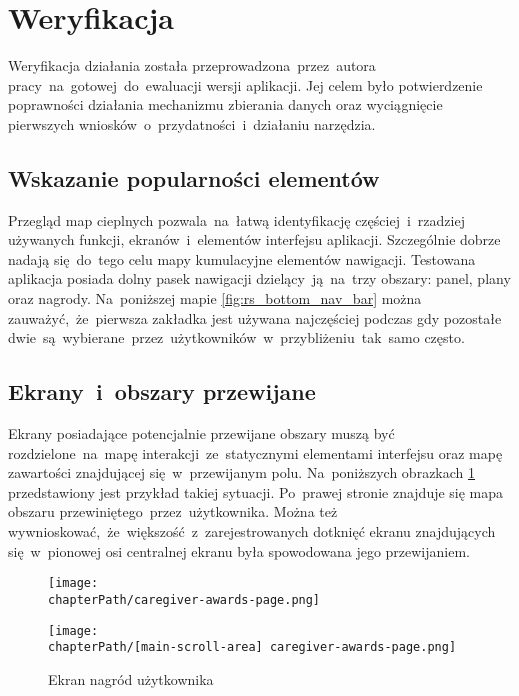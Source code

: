 \section{Weryfikacja}
Weryfikacja działania została przeprowadzona~przez~autora pracy~na~gotowej~do~ewaluacji wersji aplikacji. Jej celem było potwierdzenie poprawności działania mechanizmu zbierania danych oraz wyciągnięcie pierwszych wniosków~o~przydatności~i~działaniu narzędzia.

\subsection{Wskazanie popularności elementów}
Przegląd map cieplnych pozwala~na~łatwą identyfikację częściej~i~rzadziej używanych funkcji, ekranów~i~elementów interfejsu aplikacji. Szczególnie dobrze nadają się~do~tego celu mapy kumulacyjne elementów nawigacji. Testowana aplikacja posiada dolny pasek nawigacji dzielący~ją~na~trzy obszary: panel, plany oraz nagrody. Na~poniższej mapie \ref{fig:rs_bottom_nav_bar} można zauważyć,~że~pierwsza zakładka jest używana najczęściej podczas gdy pozostałe dwie~są~wybierane~przez~użytkowników~w~przybliżeniu~tak~samo często.

\bigskip
{}

\subsection{Ekrany~i~obszary przewijane}
Ekrany posiadające potencjalnie przewijane obszary muszą być rozdzielone~na~mapę interakcji~ze~statycznymi elementami interfejsu oraz mapę zawartości znajdującej się~w~przewijanym polu. Na~poniższych obrazkach \ref{fig:rs_panel_parts} przedstawiony jest przykład takiej sytuacji. Po~prawej stronie znajduje się mapa obszaru przewiniętego~przez~użytkownika. Można też wywnioskować,~że~większość~z~zarejestrowanych dotknięć ekranu znajdujących się~w~pionowej osi centralnej ekranu była spowodowana jego przewijaniem. 

\bigskip
\begin{figure}[H]
\centering
\begin{minipage}{.35\textwidth}
	\centering
	\texttt{[image: \\chapterPath/caregiver-awards-page.png]}
\end{minipage}
\begin{minipage}{.3\textwidth}
	\centering
	\texttt{[image: \\chapterPath/[main-scroll-area] caregiver-awards-page.png]}
\end{minipage}
\bigskip
\caption{Ekran nagród użytkownika}
\label{fig:rs_panel_parts}
\end{figure}

